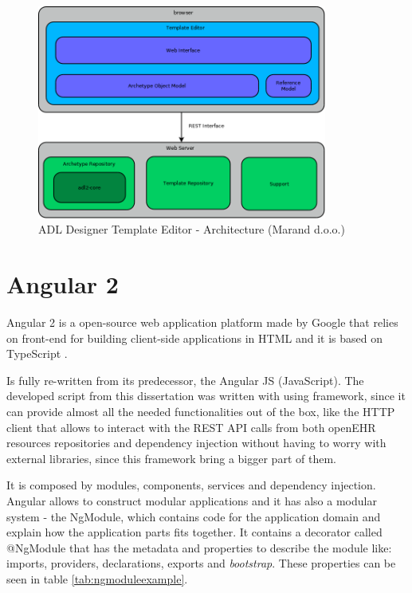 \documentclass[mim_thesis.tex]{subfiles}
\begin{document}
\begin{figure}[H]
	\centering
    \includegraphics[width=0.85\textwidth]{img/template-editor-architecture.png}
	\caption{ADL Designer Template Editor - Architecture  (Marand d.o.o.)}
	\label{fig:templateEditorArchitecture}
\end{figure}

\section{Angular 2}
Angular 2 is a open-source web application platform made by Google that relies on front-end for building client-side applications in \ac{HTML} and it is based on TypeScript \citep{angular}.

Is fully re-written from its predecessor, the Angular JS (JavaScript). The developed script from this dissertation was written with using framework, since it can provide almost all the needed functionalities out of the box, like the HTTP client that allows to interact with the REST API calls from both openEHR resources repositories and dependency injection without having to worry with external libraries, since this framework bring a bigger part of them.

It is composed by modules, components, services and dependency injection. 
Angular allows to construct modular applications and it has also a modular system - the NgModule, which contains code for the application domain and explain how the application parts fits together. It contains a decorator called @NgModule that has the metadata and properties to describe the module like: imports, providers, declarations, exports and \textit{bootstrap}. These properties can be seen in table \ref{tab:ngmoduleexample}. 
\end{document}
